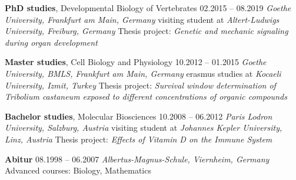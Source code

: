 \documentclass[10pt, b5paper, singlespacinge, twoside]{reedthesis} %
\theoremstyle{definition}
\theoremstyle{definition}
\theoremstyle{definition}
\theoremstyle{remark}
\begin{document}


\makebox[3cm][l]{}


\vspace{0.3cm}

 \hrulefill
\vspace{0.2cm}

\noindent \textbf{PhD studies}, Developmental Biology of Vertebrates \hfill 02.2015 -- 08.2019\newline
\emph{Goethe University, Frankfurt am Main, Germany}\newline
visiting student at \emph{Altert-Ludwigs University, Freiburg, Germany}\newline
Thesis project: \emph{Genetic and mechanic signaling during organ development}

\vspace{0.3cm}

\noindent \textbf{Master studies}, Cell Biology and Physiology \hfill 10.2012 -- 01.2015\newline
\emph{Goethe University, BMLS, Frankfurt am Main, Germany}\newline
erasmus studies at \emph{Kocaeli University, Izmit, Turkey}\newline
Thesis project: \emph{Survival window determination of Tribolium castaneum \newline exposed to different concentrations of organic compounds}

\vspace{0.3cm}

\noindent \textbf{Bachelor studies}, Molecular Biosciences \hfill 10.2008 -- 06.2012\newline
\emph{Paris Lodron University, Salzburg, Austria}\newline
visiting student at \emph{Johannes Kepler University, Linz, Austria}\newline
Thesis project: \emph{Effects of Vitamin D on the Immune System}

\vspace{0.3cm}

\noindent \textbf{Abitur} \hfill 08.1998 -- 06.2007\newline
\emph{Albertus-Magnus-Schule, Viernheim, Germany}\newline
Advanced courses: Biology, Mathematics
\end{document}

